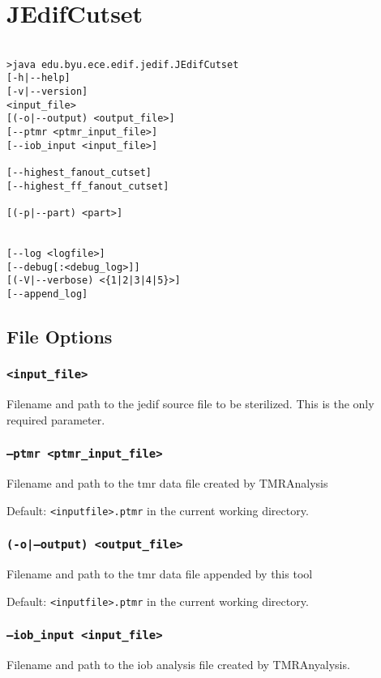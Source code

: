\section{JEdifCutset}
\begin{verbatim}

>java edu.byu.ece.edif.jedif.JEdifCutset 
[-h|--help] 
[-v|--version] 
<input_file> 
[(-o|--output) <output_file>] 
[--ptmr <ptmr_input_file>] 
[--iob_input <input_file>] 

[--highest_fanout_cutset] 
[--highest_ff_fanout_cutset] 

[(-p|--part) <part>] 


[--log <logfile>] 
[--debug[:<debug_log>]] 
[(-V|--verbose) <{1|2|3|4|5}>] 
[--append_log]

\end{verbatim}
\subsection{File Options}

\subsubsection{\texttt{<input\_file>}}
Filename and path to the jedif source file to be
sterilized. This is the only required parameter.

\subsubsection{\texttt{--ptmr <ptmr\_input\_file>}}
Filename and path to the tmr data file created by TMRAnalysis

Default: \texttt{<inputfile>.ptmr} in the current working directory.

\subsubsection{\texttt{(-o|--output) <output\_file>}}
Filename and path to the tmr data file appended by this tool

Default: \texttt{<inputfile>.ptmr} in the current working directory.

\subsubsection{\texttt{--iob\_input <input\_file>}}
Filename and path to the iob analysis file created by TMRAnyalysis.

